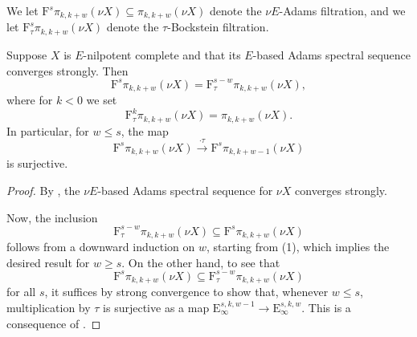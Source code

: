 \begin{ntn}
    We let $\mathrm{F}^s \pi_{k,k+w} (\nu X) \subseteq \pi_{k,k+w} (\nu X)$ denote the $\nu E$-Adams filtration, and we let $\mathrm{F}^{s}_{\tau} \pi_{k,k+w}(\nu X)$ denote the $\tau$-Bockstein filtration.
\end{ntn}

\begin{cor} \label{cor:tau-surj}
  Suppose $X$ is $E$-nilpotent complete and that its $E$-based Adams spectral sequence converges strongly. Then
    $$\mathrm{F}^{s} \pi_{k,k+w}(\nu X) = \mathrm{F}^{s-w}_{\tau} \pi_{k,k+w}(\nu X),$$
    where for $k < 0$ we set
    \[\mathrm{F}^{k} _{\tau} \pi_{k,k+w} (\nu X) = \pi_{k,k+w} (\nu X).\]
    In particular, for $w \leq s$, the map
  $$ \mathrm{F}^s\pi_{k,k+w}(\nu X) \xrightarrow{\cdot \tau} \mathrm{F}^s\pi_{k,k+w-1}(\nu X) $$
  is surjective.
	

\end{cor}

\begin{proof}
  By , the $\nu E$-based Adams spectral sequence for $\nu X$ converges strongly.

    Now, the inclusion
    $$\mathrm{F}^{s-w} _{\tau} \pi_{k,k+w}(\nu X) \subseteq \mathrm{F}^{s} \pi_{k,k+w}(\nu X)$$
    follows from a downward induction on $w$, starting from (1), which implies the desired result for $w \geq s$.
    On the other hand, to see that 
    $$\mathrm{F}^{s} \pi_{k,k+w}(\nu X) \subseteq \mathrm{F}^{s-w}_{\tau} \pi_{k,k+w}(\nu X)$$
    for all $s$, it suffices by strong convergence to show that, whenever $w \leq s$, multiplication by $\tau$ is surjective as a map $\mathrm{E}_{\infty} ^{s,k,w-1} \to \mathrm{E}_{\infty} ^{s,k,w}$. This is a consequence of .
%
\end{proof}

